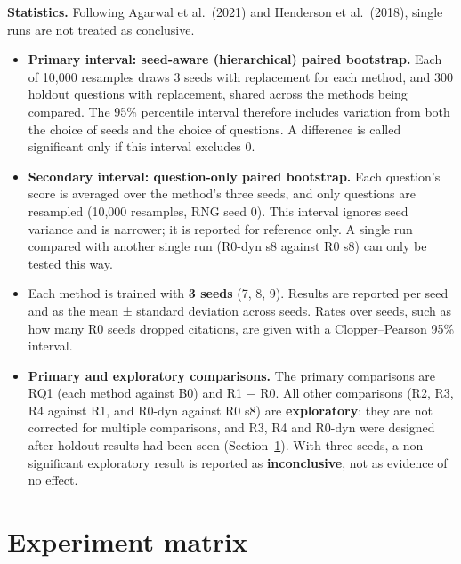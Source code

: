 \textbf{Statistics.} Following Agarwal et al.~(2021) and Henderson et
al.~(2018), single runs are not treated as conclusive.

\begin{itemize}
\tightlist
\item
  \textbf{Primary interval: seed-aware (hierarchical) paired bootstrap.}
  Each of 10,000 resamples draws 3 seeds with replacement for each
  method, and 300 holdout questions with replacement, shared across the
  methods being compared. The 95\% percentile interval therefore
  includes variation from both the choice of seeds and the choice of
  questions. A difference is called significant only if this interval
  excludes 0.
\item
  \textbf{Secondary interval: question-only paired bootstrap.} Each
  question's score is averaged over the method's three seeds, and only
  questions are resampled (10,000 resamples, RNG seed 0). This interval
  ignores seed variance and is narrower; it is reported for reference
  only. A single run compared with another single run (R0-dyn s8 against
  R0 s8) can only be tested this way.
\item
  Each method is trained with \textbf{3 seeds} (7, 8, 9). Results are
  reported per seed and as the mean ± standard deviation across seeds.
  Rates over seeds, such as how many R0 seeds dropped citations, are
  given with a Clopper--Pearson 95\% interval.
\item
  \textbf{Primary and exploratory comparisons.} The primary comparisons
  are RQ1 (each method against B0) and R1 − R0. All other comparisons
  (R2, R3, R4 against R1, and R0-dyn against R0 s8) are
  \textbf{exploratory}: they are not corrected for multiple comparisons,
  and R3, R4 and R0-dyn were designed after holdout results had been
  seen (Section~\ref{sec:3.8}). With three seeds, a non-significant
  exploratory result is reported as \textbf{inconclusive}, not as
  evidence of no effect.
\end{itemize}

\section{Experiment matrix}\label{sec:3.8}

